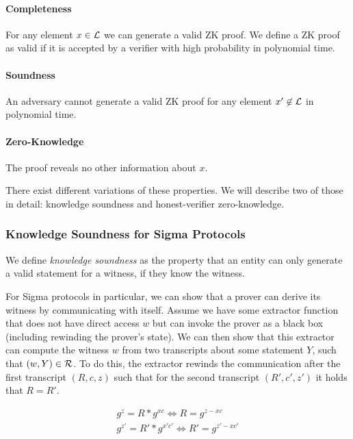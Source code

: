 \paragraph{Completeness} For any element $x \in {\cal L}$ we can generate a valid ZK proof.
We define a ZK proof as valid if it is accepted by a verifier with high probability in polynomial time.

\paragraph{Soundness} An adversary cannot generate a valid ZK proof for any element $x' \not \in {\cal L}$ in polynomial time.

\paragraph{Zero-Knowledge} The proof reveals no other information about $x$.


There exist different variations of these properties. We will describe two of those in detail: knowledge soundness and honest-verifier zero-knowledge.

\subsubsection*{Knowledge Soundness for Sigma Protocols}
We define \emph{knowledge soundness} as the property that an entity can only generate a valid statement for a witness, if they know the witness.

For Sigma protocols in particular, we can show that a prover can derive its witness by communicating with itself.
Assume we have some extractor function that does not have direct access $w$ but can invoke the prover as a black box (including rewinding the prover's state).
We can then show that this extractor can compute the witness $w$ from two transcripts about some statement $Y$, such that $(w, Y) \in {\cal R}$.
To do this, the extractor rewinds the communication after the first transcript $(R,c,z)$ such that for the second transcript $(R', c', z')$ it holds that $R = R'$.

\begin{align*}
    g^z = R * g^{xc} \Leftrightarrow R = g^{z-xc} \\
    g^{z'} = R' * g^{x'c'} \Leftrightarrow R' = g^{z'-xc'} \\
\end{align*}

